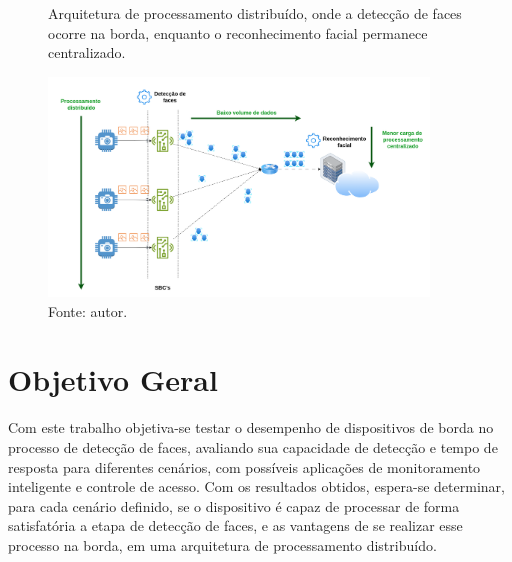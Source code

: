 \begin{figure}[H]
    \centering
    \caption[Arquitetura de processamento distribuído, onde a detecção de faces ocorre na borda, enquanto o reconhecimento facial permanece centralizado.]{Arquitetura de processamento distribuído, onde a detecção de faces ocorre na borda, enquanto o reconhecimento facial permanece centralizado.}
    \includegraphics[width=0.9\textwidth]{Cap1_Introducao/Figures/sistema_distribudo.png}
    \caption*{Fonte: autor.}
    \label{fig:sistemDistribuido}
\end{figure}

\section{Objetivo Geral}

Com este trabalho objetiva-se testar o desempenho de dispositivos de borda no processo de detecção de faces, avaliando sua capacidade de detecção e tempo de resposta para diferentes cenários, com possíveis aplicações de monitoramento inteligente e controle de acesso. Com os resultados obtidos, espera-se determinar, para cada cenário definido, se o dispositivo é capaz de processar de forma satisfatória a etapa de detecção de faces, e as vantagens de se realizar esse processo na borda, em uma arquitetura de processamento distribuído.

